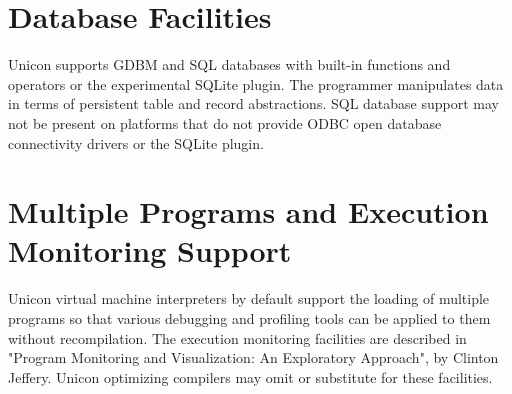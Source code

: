 \section{Database Facilities}

Unicon supports GDBM and SQL databases with
built-in functions and operators or the experimental SQLite plugin.
The programmer manipulates data in
terms of persistent table and record abstractions. SQL database support
may not be present on platforms that do not provide ODBC
open database connectivity drivers or the SQLite plugin.

\section{Multiple Programs and Execution Monitoring Support}

Unicon virtual machine interpreters by default support the loading of
multiple programs so that various debugging and profiling tools can be
applied to them without recompilation. The execution monitoring
facilities are described in "Program Monitoring and
Visualization: An Exploratory Approach", by Clinton
Jeffery. Unicon optimizing compilers may
omit or substitute for these facilities.
